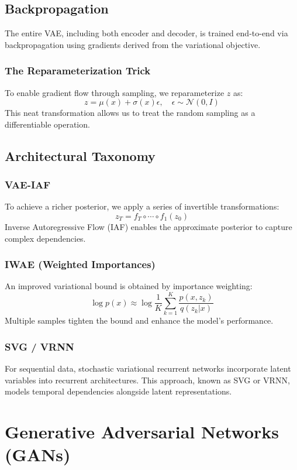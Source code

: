 \documentclass{article}
\begin{document}
\subsection{Backpropagation}
The entire VAE, including both encoder and decoder, is trained end-to-end via backpropagation using gradients derived from the variational objective.

\subsubsection{The Reparameterization Trick}
To enable gradient flow through sampling, we reparameterize \(z\) as:
\[
z = \mu(x) + \sigma(x)\epsilon, \quad \epsilon \sim \mathcal{N}(0, I)
\]
This neat transformation allows us to treat the random sampling as a differentiable operation.

\subsection{Architectural Taxonomy}

\subsubsection{VAE-IAF}
To achieve a richer posterior, we apply a series of invertible transformations:
\[
z_T = f_T \circ \cdots \circ f_1(z_0)
\]
Inverse Autoregressive Flow (IAF) enables the approximate posterior to capture complex dependencies.

\subsubsection{IWAE (Weighted Importances)}
An improved variational bound is obtained by importance weighting:
\[
\log p(x) \approx \log \frac{1}{K} \sum_{k=1}^{K} \frac{p(x,z_k)}{q(z_k|x)}
\]
Multiple samples tighten the bound and enhance the model's performance.

\subsubsection{SVG / VRNN}
For sequential data, stochastic variational recurrent networks incorporate latent variables into recurrent architectures. This approach, known as SVG or VRNN, models temporal dependencies alongside latent representations.

\clearpage\newpage

\section{Generative Adversarial Networks (GANs)} \label{sec:gan}
\end{document}
